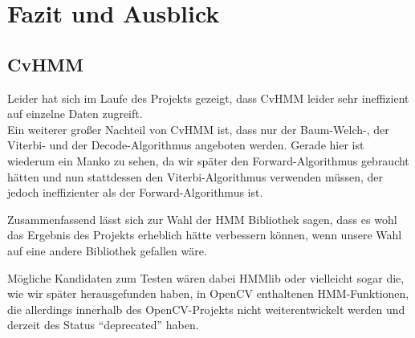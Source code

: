 \section{Fazit und Ausblick}
\label{chap:fazit}


\subsection{CvHMM}
\label{sec:CvHMM}
Leider hat sich im Laufe des Projekts gezeigt, dass CvHMM leider sehr ineffizient auf einzelne Daten zugreift.\\

Ein weiterer großer Nachteil von CvHMM ist, dass nur der Baum-Welch-, der Viterbi- und der Decode-Algorithmus angeboten werden.
 Gerade hier ist wiederum ein Manko zu sehen, da wir später den Forward-Algorithmus gebraucht hätten und nun stattdessen den Viterbi-Algorithmus verwenden müssen, der jedoch ineffizienter als der Forward-Algorithmus ist.

Zusammenfassend lässt sich zur Wahl der HMM Bibliothek sagen, dass es wohl das Ergebnis des Projekts erheblich hätte verbessern können, wenn unsere Wahl auf eine andere Bibliothek gefallen wäre.

Mögliche Kandidaten zum Testen wären dabei HMMlib oder vielleicht sogar die, wie wir später herausgefunden haben, in OpenCV enthaltenen HMM-Funktionen, die allerdings innerhalb des OpenCV-Projekts nicht weiterentwickelt werden und derzeit des Status “deprecated” haben.



